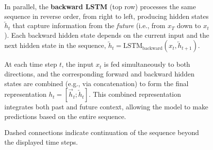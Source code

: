 \begin{figure}[!htp]
{    \highspace
    In parallel, the \textbf{backward LSTM} (top row) processes the same sequence in reverse order, from right to left, producing hidden states $\overleftarrow{h}_t$ that capture information from the \emph{future} (i.e., from $x_T$ down to $x_t$). Each backward hidden state depends on the current input and the next hidden state in the sequence, $\overleftarrow{h}_t = \text{LSTM}_{\text{backward}}(x_t, \overleftarrow{h}_{t+1})$.

    \highspace
    At each time step $t$, the input $x_t$ is fed simultaneously to both directions, and the corresponding forward and backward hidden states are combined (e.g., via concatenation) to form the final representation $h_t = [\overrightarrow{h}_t ; \overleftarrow{h}_t]$. This combined representation integrates both past and future context, allowing the model to make predictions based on the entire sequence.

    \highspace
    Dashed connections indicate continuation of the sequence beyond the displayed time steps.}
\end{figure}